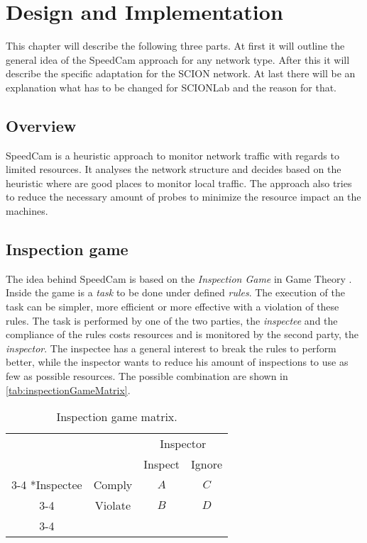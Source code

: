 \documentclass[thesis.tex]{subfiles}
\begin{document}
\chapter{Design and Implementation}\label{chap:main}

This chapter will describe the following three parts. At first it will outline the general idea of the SpeedCam approach for any network type. After this it will describe the specific adaptation for the SCION network. At last there will be an explanation what has to be changed for SCIONLab and the reason for that.

\section{Overview}
SpeedCam is a heuristic approach to monitor network traffic with regards to limited resources. It analyses the network structure and decides based on the heuristic where are good places to monitor local traffic. The approach also tries to reduce the necessary amount of probes to minimize the resource impact an the machines.

\section{Inspection game}
The idea behind SpeedCam is based on the \textit{Inspection Game} in Game Theory \cite{Dutta.1999, Owen.2013}. Inside the game is a \textit{task} to be done under defined \textit{rules}. The execution of the task can be simpler, more efficient or more effective with a violation of these rules. The task is performed by one of the two parties, the \textit{inspectee} and the compliance of the rules costs resources and is monitored by the second party, the \textit{inspector}. The inspectee has a general interest to break the rules to perform better, while the inspector wants to reduce his amount of inspections to use as few as possible resources. The possible combination are shown in \autoref{tab:inspectionGameMatrix}.

\begin{table}[h]
    \centering
    \begin{tabular}{cc|c|c|}
        & \multicolumn{1}{c}{} & \multicolumn{2}{c}{Inspector}\\
        & \multicolumn{1}{c}{} & \multicolumn{1}{c}{Inspect}  & \multicolumn{1}{c}{Ignore} \\\cline{3-4}
        \multirow{2}*{Inspectee}  & Comply & $A$ & $C$ \\\cline{3-4}
        & Violate & $B$ & $D$ \\\cline{3-4}
    \end{tabular}
    \caption{Inspection game matrix.}
    \label{tab:inspectionGameMatrix}
\end{table}
\end{document}
